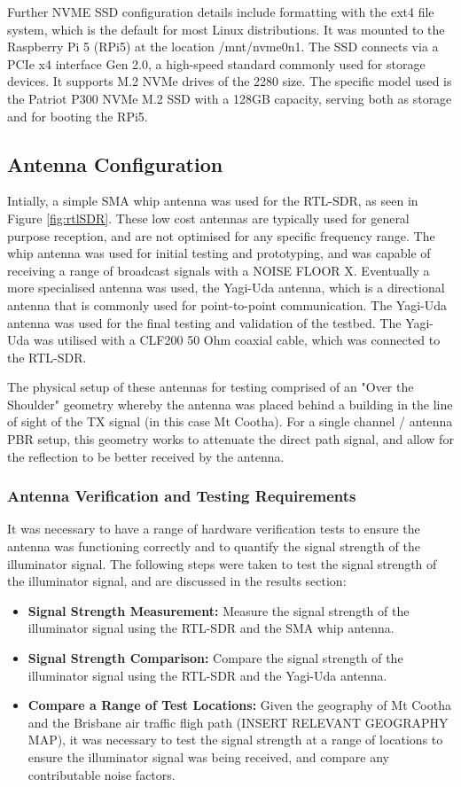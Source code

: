 Further NVME SSD configuration details include formatting with the ext4 file system, which is the default for most Linux distributions. It was mounted to the Raspberry Pi 5 (RPi5) at the location /mnt/nvme0n1. The SSD connects via a PCIe x4 interface Gen 2.0, a high-speed standard commonly used for storage devices. It supports M.2 NVMe drives of the 2280 size. The specific model used is the Patriot P300 NVMe M.2 SSD with a 128GB capacity, serving both as storage and for booting the RPi5.


\subsection{Antenna Configuration \label{sec:antenna}}
Intially, a simple SMA whip antenna was used for the RTL-SDR, as seen in Figure \ref{fig:rtlSDR}. These low cost antennas are typically used for general purpose reception, and are not optimised for any specific frequency range. The whip antenna was used for initial testing and prototyping, and was capable of receiving a range of broadcast signals with a NOISE FLOOR X. Eventually a more specialised antenna was used, the Yagi-Uda antenna, which is a directional antenna that is commonly used for point-to-point communication. The Yagi-Uda antenna was used for the final testing and validation of the testbed. The Yagi-Uda was utilised with a CLF200 50 Ohm coaxial cable, which was connected to the RTL-SDR. 


The physical setup of these antennas for testing comprised of an "Over the Shoulder" geometry whereby the antenna was placed behind a building in the line of sight of the TX signal (in this case Mt Cootha). For a single channel / antenna PBR setup, this geometry works to attenuate the direct path signal, and allow for the reflection to be better received by the antenna. 

\subsubsection{Antenna Verification and Testing Requirements}
It was necessary to have a range of hardware verification tests to ensure the antenna was functioning correctly and to quantify the signal strength of the illuminator signal. The following steps were taken to test the signal strength of the illuminator signal, and are discussed in the results section:
\begin{itemize}
    \item \textbf{Signal Strength Measurement:} Measure the signal strength of the illuminator signal using the RTL-SDR and the SMA whip antenna.
    \item \textbf{Signal Strength Comparison:} Compare the signal strength of the illuminator signal using the RTL-SDR and the Yagi-Uda antenna.
    \item \textbf{Compare a Range of Test Locations:} Given the geography of Mt Cootha and the Brisbane air traffic fligh path (INSERT RELEVANT GEOGRAPHY MAP), it was necessary to test the signal strength at a range of locations to ensure the illuminator signal was being received, and compare any contributable noise factors.
\end{itemize}


